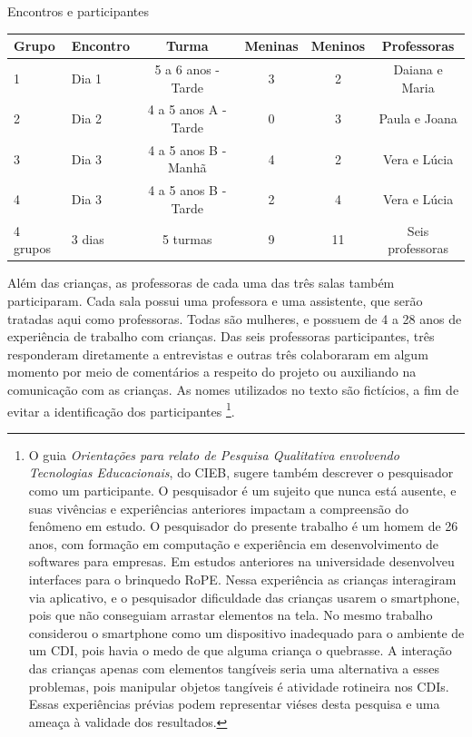  \begin{quadro}[!h]
 		\setlength{\extrarowheight}{3pt}
        \begin{center}
        \caption{Encontros e participantes}
        \label{quadro:participants}
        \begin{tabular}{@{}llcccc@{}}
            \toprule
            Grupo & Encontro & Turma  & Meninas & Meninos & Professoras \\ \midrule
            1         & Dia 1                       & 5 a 6 anos - Tarde      & 3 & 2 & Daiana e Maria \\
            2         & Dia 2                       & 4 a 5 anos A - Tarde   & 0 & 3 & Paula e Joana \\
            3         & Dia 3                       & 4 a 5 anos B - Manhã & 4 & 2 & Vera e Lúcia \\
            4         & Dia 3                       & 4 a 5 anos B - Tarde   & 2 & 4 & Vera e Lúcia \\ \midrule
            4 grupos          & 3 dias        & 5 turmas     & 9 & 11 & Seis professoras \\ \bottomrule 
            \end{tabular}
        \end{center}
        \sourceauthor
    \end{quadro}

Além das crianças, as professoras de cada uma das três salas também participaram. Cada sala possui uma professora e uma assistente, que serão tratadas aqui como professoras. Todas são mulheres, e possuem de 4 a 28 anos de experiência de trabalho com crianças. Das seis professoras participantes, três responderam diretamente a entrevistas e outras três colaboraram em algum momento por meio de comentários a respeito do projeto ou auxiliando na comunicação com as crianças. As nomes utilizados no texto são fictícios, a fim de evitar a identificação dos participantes
\footnote{
    O guia \textit{Orientações para relato de Pesquisa Qualitativa envolvendo Tecnologias Educacionais}, do \ac{CIEB}, sugere também descrever o pesquisador como um participante. O pesquisador é um sujeito que nunca está ausente, e suas vivências e experiências anteriores impactam a compreensão do fenômeno em estudo. O pesquisador do presente trabalho é um homem de 26 anos, com formação em computação e experiência em desenvolvimento de softwares para empresas. Em estudos anteriores na universidade desenvolveu interfaces para o brinquedo RoPE. Nessa experiência as crianças interagiram via aplicativo, e o pesquisador dificuldade das crianças usarem o smartphone, pois que não conseguiam arrastar elementos na tela. No mesmo trabalho considerou o smartphone como um dispositivo inadequado para o ambiente de um CDI, pois havia o medo de que alguma criança o quebrasse. A interação das crianças apenas com elementos tangíveis seria uma alternativa a esses problemas, pois manipular objetos tangíveis é atividade rotineira nos CDIs. Essas experiências prévias podem representar viéses desta pesquisa e uma ameaça à validade dos resultados.
}.

